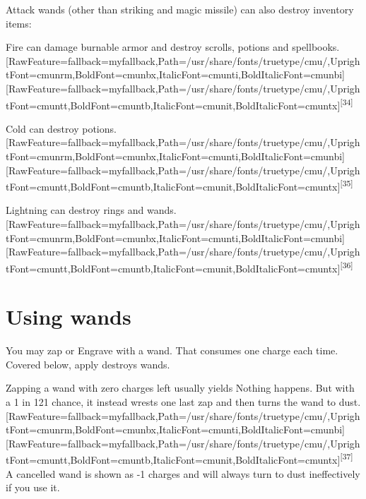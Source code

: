 Attack wands (other than striking and magic missile) can also destroy inventory items:




\begin{myitemize}\item{}Fire can damage burnable armor and destroy scrolls, potions and spellbooks.\allowbreak{}\setmainfont{cmunrm.ttf}[RawFeature={fallback=myfallback},Path=/usr/share/fonts/truetype/cmu/,UprightFont=cmunrm,BoldFont=cmunbx,ItalicFont=cmunti,BoldItalicFont=cmunbi]\setmonofont{cmunrm.ttf}[RawFeature={fallback=myfallback},Path=/usr/share/fonts/truetype/cmu/,UprightFont=cmuntt,BoldFont=cmuntb,ItalicFont=cmunit,BoldItalicFont=cmuntx]\textsuperscript{{$\text{[}$}34{$\text{]}$}}
\item{}Cold can destroy potions.\allowbreak{}\setmainfont{cmunrm.ttf}[RawFeature={fallback=myfallback},Path=/usr/share/fonts/truetype/cmu/,UprightFont=cmunrm,BoldFont=cmunbx,ItalicFont=cmunti,BoldItalicFont=cmunbi]\setmonofont{cmunrm.ttf}[RawFeature={fallback=myfallback},Path=/usr/share/fonts/truetype/cmu/,UprightFont=cmuntt,BoldFont=cmuntb,ItalicFont=cmunit,BoldItalicFont=cmuntx]\textsuperscript{{$\text{[}$}35{$\text{]}$}}
\item{}Lightning can destroy rings and wands.\allowbreak{}\setmainfont{cmunrm.ttf}[RawFeature={fallback=myfallback},Path=/usr/share/fonts/truetype/cmu/,UprightFont=cmunrm,BoldFont=cmunbx,ItalicFont=cmunti,BoldItalicFont=cmunbi]\setmonofont{cmunrm.ttf}[RawFeature={fallback=myfallback},Path=/usr/share/fonts/truetype/cmu/,UprightFont=cmuntt,BoldFont=cmuntb,ItalicFont=cmunit,BoldItalicFont=cmuntx]\textsuperscript{{$\text{[}$}36{$\text{]}$}}
\end{myitemize}

\section{Using wands}
\label{8}
You may z\footnotemark[118]ap or E\footnotemark[119]ngrave with a wand. That consumes one charge each time. Covered below,\footnotemark[120] a\footnotemark[121]pply destroys wands.


Zapping a wand with zero charges left usually yields Nothing happens. But with a 1 in 121 chance, it instead wrests one last zap and then turns the wand to dust.\allowbreak{}\setmainfont{cmunrm.ttf}[RawFeature={fallback=myfallback},Path=/usr/share/fonts/truetype/cmu/,UprightFont=cmunrm,BoldFont=cmunbx,ItalicFont=cmunti,BoldItalicFont=cmunbi]\setmonofont{cmunrm.ttf}[RawFeature={fallback=myfallback},Path=/usr/share/fonts/truetype/cmu/,UprightFont=cmuntt,BoldFont=cmuntb,ItalicFont=cmunit,BoldItalicFont=cmuntx]\textsuperscript{{$\text{[}$}37{$\text{]}$}} A cancelled wand is shown as -{}1 charges and will always turn to dust ineffectively if you use it.


